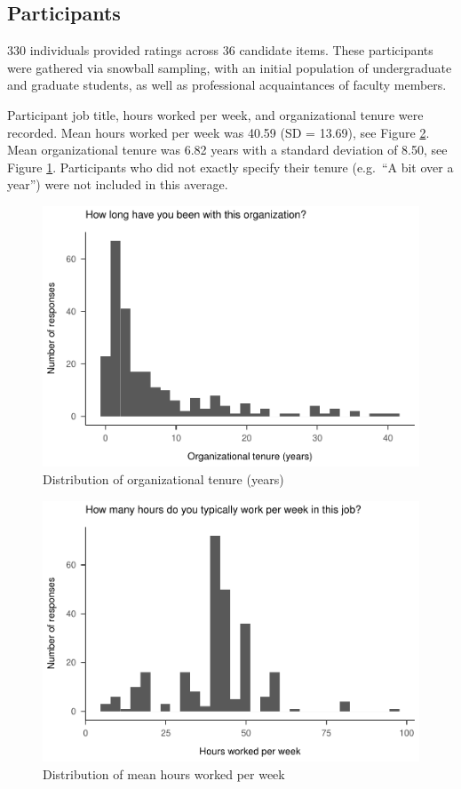 \documentclass[
  english,
  man]{apa6}
\begin{document}
\hypertarget{participants}{%
\subsection{Participants}\label{participants}}

330 individuals provided ratings across 36 candidate items. These participants were gathered via snowball sampling, with an initial population of undergraduate and graduate students, as well as professional acquaintances of faculty members.

Participant job title, hours worked per week, and organizational tenure were recorded. Mean hours worked per week was 40.59 (SD = 13.69), see Figure \ref{fig:hours}. Mean organizational tenure was 6.82 years with a standard deviation of 8.50, see Figure \ref{fig:tenure}. Participants who did not exactly specify their tenure (e.g.~``A bit over a year'') were not included in this average.

\begin{figure}
\centering
\includegraphics{SIOPpapaja_files/figure-latex/tenure-1.pdf}
\caption{\label{fig:tenure}Distribution of organizational tenure (years)}
\end{figure}

\begin{figure}
\centering
\includegraphics{SIOPpapaja_files/figure-latex/hours-1.pdf}
\caption{\label{fig:hours}Distribution of mean hours worked per week}
\end{figure}
\end{document}
